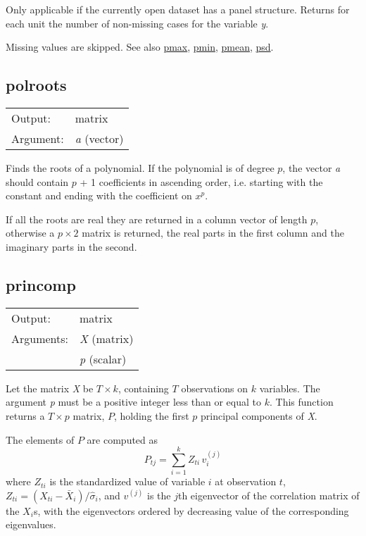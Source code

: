 	  Only applicable if the currently open dataset has a panel
	  structure. Returns for each unit the number of non-missing
	  cases for the variable \textsl{y}.

	  Missing values are skipped. 
	  See also \hyperlink{func-pmax}{pmax}, \hyperlink{func-pmin}{pmin}, \hyperlink{func-pmean}{pmean}, \hyperlink{func-psd}{psd}.
\subsection{polroots}
\hypertarget{func-polroots}{}

\begin{tabular}{ll}
Output:     & matrix\\
Argument:   & \textsl{a} (vector)\\
\end{tabular}

	  Finds the roots of a polynomial.  If the polynomial is of degree
	  \ensuremath{p}, the vector \textsl{a} should contain
	  \ensuremath{p} + 1 coefficients in ascending order, i.e.{} starting
	  with the constant and ending with the coefficient on
	  \ensuremath{x}\ensuremath{^{p}}.

	  If all the roots are real they are returned in a column vector of
	  length \ensuremath{p}, otherwise a \ensuremath{p\times 2} matrix
	  is returned, the real parts in the first column and the imaginary
	  parts in the second.

\subsection{princomp}
\hypertarget{func-princomp}{}

\begin{tabular}{ll}
Output:     & matrix\\
Arguments:  & \textsl{X} (matrix)\\
           & \textsl{p} (scalar)\\
\end{tabular}

	  Let the matrix \textsl{X} be \ensuremath{T\times k}, containing
	  \ensuremath{T} observations on \ensuremath{k} variables.  The
	  argument \textsl{p} must be a positive integer less than
	  or equal to \ensuremath{k}. This function returns a \ensuremath{T\times p} matrix, \ensuremath{P}, holding the first \ensuremath{p}
	  principal components of \textsl{X}.

	  The elements of $P$ are computed as 
	  \[ P_{tj} = \sum_{i=1}^{k} Z_{ti} \, v^{(j)}_i \] 
	  where $Z_{ti}$ is the standardized value
	  of variable $i$ at observation $t$, $Z_{ti} = (X_{ti} -
	  \bar{X}_i) / \hat{\sigma}_i$, and $v^{(j)}$ is the $j$th
	  eigenvector of the correlation matrix of the $X_i$s, with the
	  eigenvectors ordered by decreasing value of the corresponding
	  eigenvalues.

